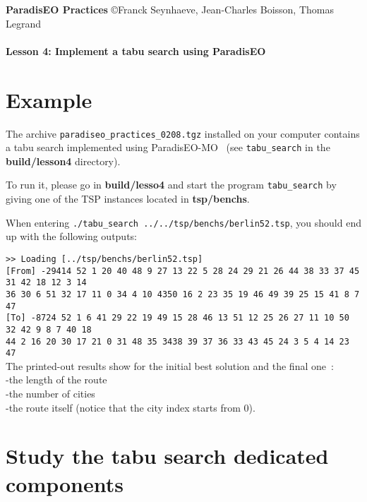 \documentclass[a4paper]{article}
\begin{document}
\textbf{ParadisEO Practices}  {\copyright Franck Seynhaeve,
Jean-Charles Boisson, Thomas Legrand} \Large{\textbf{\\\\
Lesson 4: Implement a tabu search using ParadisEO}}

\normalsize

\vspace{-0,3cm}

\section{Example}

    The archive {\tt paradiseo\_practices\_0208.tgz} installed
    on your computer contains a tabu search implemented using ParadisEO-MO~
    (see {\tt tabu\_search} in the {\bf build/lesson4} directory).

    \medskip
    To run it, please go in {\bf build/lesso4} and start the program {\tt tabu\_search} by giving
    one of the TSP instances located in {\bf tsp/benchs}.


    \medskip
    When entering {\tt ./tabu\_search ../../tsp/benchs/berlin52.tsp}, you should end up with the
    following outputs:

    \smallskip
    \noindent
    \texttt{>> Loading [../tsp/benchs/berlin52.tsp]}\\
    \texttt{[From] -29414  52 1 20 40 48 9 27 13 22 5 28 24 29 21 26 44 38 33 37 45 31 42 18 12 3 14}\\
    \texttt{36 30 6 51 32 17 11 0 34 4 10 4350 16 2 23 35 19 46 49 39 25 15 41 8 7 47}\\
    \texttt{[To] -8724  52 1 6 41 29 22 19 49 15 28 46 13 51 12 25 26 27 11 10 50 32 42 9 8 7 40 18}\\
    \texttt{44 2 16 20 30 17 21 0 31 48 35 3438 39 37 36 33 43 45 24 3 5 4 14 23 47}\\

    The printed-out results show for the initial best solution and the final one~:
    \\ \hspace*{1cm}-the length of the route
    \\ \hspace*{1cm}-the number of cities
    \\ \hspace*{1cm}-the route itself (notice that the city index starts from 0).


\section{Study the tabu search dedicated components}
\end{document}
